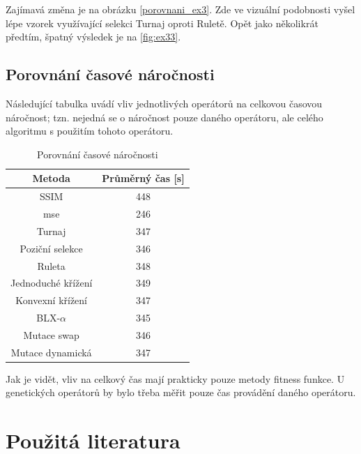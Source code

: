 \documentclass[a4paper,11pt]{scrartcl}
\begin{document}
Zajímavá změna je na obrázku \ref{porovnani_ex3}. Zde ve vizuální podobnosti vyšel lépe vzorek využívající selekci Turnaj oproti Ruletě. Opět jako několikrát předtím, špatný výsledek je na \ref{fig:ex33}.


\subsection{Porovnání časové náročnosti}

Následující tabulka uvádí vliv jednotlivých operátorů na celkovou časovou náročnost; tzn. nejedná se o náročnost pouze daného operátoru, ale celého algoritmu s použitím tohoto operátoru.

\begin{table}[!h]
  \caption{Porovnání časové náročnosti}
  \label{tab:por}

  \begin{center}
    \begin{tabular}{|c|c|}
    \hline
       Metoda & Průměrný čas [s] \\
       \hline
       SSIM & 448 \\
        mse &
        246 \\
        Turnaj &
        347 \\
        Poziční selekce &
        346 \\
        Ruleta &
        348 \\
        Jednoduché křížení &
        349 \\
        Konvexní křížení &
        347 \\
        BLX-$\alpha$ &
        345 \\
        Mutace swap &
        346 \\
        Mutace dynamická &
        347 \\
        \hline
    \end{tabular}
  \end{center}
\end{table}

Jak je vidět, vliv na celkový čas mají prakticky pouze metody fitness funkce. U genetických operátorů by bylo třeba měřit pouze čas provádění daného operátoru.

\section{Použitá literatura}
\end{document}
